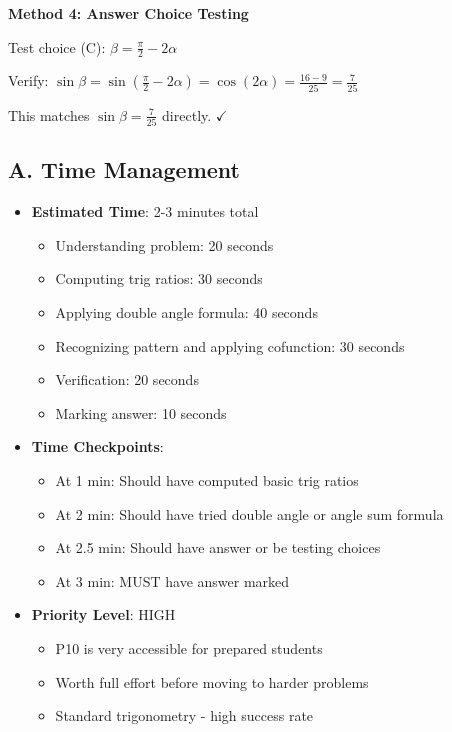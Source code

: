 \documentclass[11pt]{article}
\begin{document}
\begin{solutionbox}
\textbf{Method 4: Answer Choice Testing}

Test choice (C): $\beta = \frac{\pi}{2} - 2\alpha$

Verify: $\sin\beta = \sin\left(\frac{\pi}{2} - 2\alpha\right) = \cos(2\alpha) = \frac{16-9}{25} = \frac{7}{25}$ \checkmark

This matches $\sin\beta = \frac{7}{25}$ directly. $\checkmark$

\end{solutionbox}

\begin{competitionbox}
\subsection*{A. Time Management}
\begin{itemize}[leftmargin=*]
    \item \textbf{Estimated Time}: 2-3 minutes total
    \begin{itemize}
        \item Understanding problem: 20 seconds
        \item Computing trig ratios: 30 seconds
        \item Applying double angle formula: 40 seconds
        \item Recognizing pattern and applying cofunction: 30 seconds
        \item Verification: 20 seconds
        \item Marking answer: 10 seconds
    \end{itemize}
    
    \item \textbf{Time Checkpoints}: 
    \begin{itemize}
        \item At 1 min: Should have computed basic trig ratios
        \item At 2 min: Should have tried double angle or angle sum formula
        \item At 2.5 min: Should have answer or be testing choices
        \item At 3 min: MUST have answer marked
    \end{itemize}
    
    \item \textbf{Priority Level}: HIGH
    \begin{itemize}
        \item P10 is very accessible for prepared students
        \item Worth full effort before moving to harder problems
        \item Standard trigonometry - high success rate
    \end{itemize}
\end{itemize}


\end{competitionbox}
\end{document}
